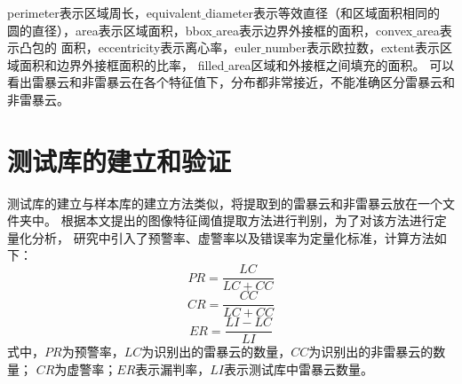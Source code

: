 perimeter表示区域周长，equivalent$\_$diameter表示等效直径（和区域面积相同的
圆的直径），area表示区域面积，bbox$\_$area表示边界外接框的面积，convex$\_$area表示凸包的
面积，eccentricity表示离心率，euler$\_$number表示欧拉数，extent表示区域面积和边界外接框面积的比率，
filled$\_$area区域和外接框之间填充的面积。
可以看出雷暴云和非雷暴云在各个特征值下，分布都非常接近，不能准确区分雷暴云和非雷暴云。

\section{测试库的建立和验证}
测试库的建立与样本库的建立方法类似，将提取到的雷暴云和非雷暴云放在一个文件夹中。
根据本文提出的图像特征阈值提取方法进行判别，为了对该方法进行定量化分析，
研究中引入了预警率、虚警率以及错误率为定量化标准，计算方法如下：
\begin{equation}
    PR=\frac{LC}{LC+CC}
\end{equation}
\begin{equation}
    CR=\frac{CC}{LC+CC}
\end{equation}
\begin{equation}
    ER=\frac{LI-LC}{LI}
\end{equation}
式中，$PR$为预警率，$LC$为识别出的雷暴云的数量，$CC$为识别出的非雷暴云的数量；
$CR$为虚警率；$ER$表示漏判率，$LI$表示测试库中雷暴云数量。 